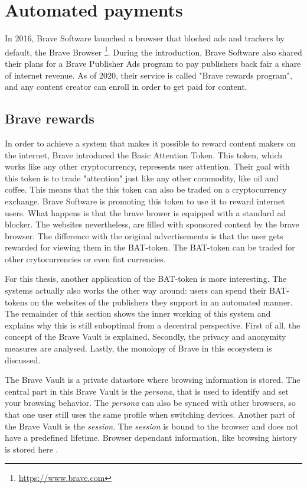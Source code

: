 \section{Automated payments}
In 2016, Brave Software launched a browser that blocked ads and trackers by default, the Brave Browser \footnote{\url{https://www.brave.com}}. During the introduction, Brave Software also shared their plans for a Brave Publisher Ads program to pay publishers back fair a share of internet revenue. As of 2020, their service is called "Brave rewards program", and any content creator can enroll in order to get paid for content. 

\subsection{Brave rewards} 
In order to achieve a system that makes it possible to reward content makers on the internet, Brave introduced the Basic Attention Token. This token, which works like any other cryptocurrency, represents user attention. Their goal with this token is to trade "attention" just like any other commodity, like oil and coffee. This means that the this token can also be traded on a cryptocurrency exchange. Brave Software is promoting this token to use it to reward internet users. What happens is that the brave brower is equipped with a standard ad blocker. The websites nevertheless, are filled with sponsored content by the brave browser. The difference with the original advertisements is that the user gets rewarded for viewing them in the BAT-token. The BAT-token can be traded for other crytocurrencies or even fiat currencies. 

For this thesis, another application of the BAT-token is more interesting. The systems actually also works the other way around: users can spend their BAT-tokens on the websites of the publishers they support in an automated manner. The remainder of this section shows the inner working of this system and explains why this is still suboptimal from a decentral perspective. First of all, the concept of the Brave Vault is explained. Secondly, the privacy and anonymity measures are analysed. Lastly, the monolopy of Brave in this ecosystem is discussed.

The Brave Vault is a private datastore where browsing information is stored. The central part in this Brave Vault is the \textit{persona}, that is used to identify and set your browsing behavior. The \textit{persona} can also be synced with other browsers, so that one user still uses the same profile when switching devices. Another part of the Brave Vault is the \textit{session}. The \textit{session} is bound to the browser and does not have a predefined lifetime. Browser dependant information, like browsing history is stored here \cite{brave-vault}.

